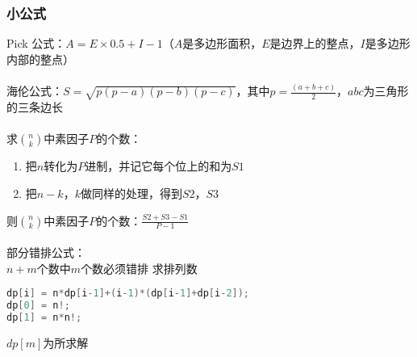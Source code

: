     \subsubsection{小公式}
    Pick 公式：$A = E\times 0.5+I-1$（$A$是多边形面积，$E$是边界上的整点，$I$是多边形内部的整点）\\
    \\
    海伦公式：$S = \sqrt{p(p-a)(p-b)(p-c)}$，其中$p = \frac{(a+b+c)}{2}$，$abc$为三角形的三条边长\\
    \\
    求$\binom{n}{k}$中素因子$P$的个数：\\
    \begin {enumerate}
	\item 把$n$转化为$P$进制，并记它每个位上的和为$S1$
	\item 把$n-k$，$k$做同样的处理，得到$S2$，$S3$
    \end{enumerate}
    则$\binom{n}{k}$中素因子$P$的个数：$\frac{S2+S3-S1}{P-1}$\\
    \\
    部分错排公式：\\
    $n+m$个数中$m$个数必须错排 求排列数
    \begin{lstlisting}[language=c++]
dp[i] = n*dp[i-1]+(i-1)*(dp[i-1]+dp[i-2]);
dp[0] = n!;
dp[1] = n*n!;
    \end{lstlisting}
    $dp[m]$为所求解\\